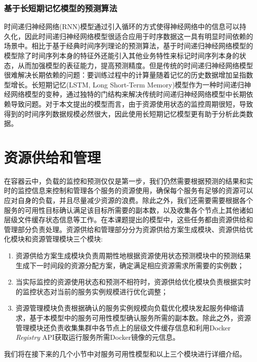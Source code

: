 \subsubsection{基于长短期记忆模型的预测算法}
时间递归神经网络(RNN)模型通过引入循环的方式使得神经网络中的信息可以持久化\cite{graves2012supervised}，因此时间递归神经网络模型很适合应用于时序数据这一具有明显时间依赖的场景中。相比于基于经典时间序列理论的预测算法，基于时间递归神经网络模型的模型除了时间序列本身的特征外还能引入其他业务特性来标记时间序列本身的状态，从而加强模型的表征能力，提高预测精度。但是传统的时间递归神经网络模型很难解决长期依赖的问题：要训练过程中的计算量随着记忆的历史数据增加呈指数型增长\cite{bengio1994learning}。长短期记忆(LSTM, Long Short-Term Memory)模型作为一种时间递归神经网络模型的变种，通过独特的门结构来解决传统时间递归神经网络模型中长期依赖导致问题。对于本文提出的模型而言，由于资源使用状态的监控周期很短，导致得到的时间序列数据规模必然很大，因此使用长短期记忆模型更有助于分析此类数据。

\section{资源供给和管理}
在容器云中，负载的监控和预测仅仅是第一步，我们仍然需要根据预测的结果和实时的监控信息来控制和管理各个服务的资源使用，确保每个服务有足够的资源可以应对自身的负载，并且尽量减少资源的浪费。除此之外，我们还需要需要根据各个服务的可用性目标确认满足该目标所需要的副本数，以及收集各个节点上其他诸如层级文件缓存状态信息等工作。在本课题提出的模型中，这些任务都由资源供给和管理部分负责处理。资源供给和管理部分分为资源供给方案生成模块、资源供给优化模块和资源管理模块三个模块:
\begin{enumerate}
\item 资源供给方案生成模块负责周期性地根据资源使用状态预测模块中的预测结果生成下一时间段的资源分配方案，确定满足相应资源需求所需要的实例数；
\item 当实际监控的资源使用状态和预测不相符时，资源供给优化模块负责根据实时的监控状态对当前的服务实例规模进行优化调整；
\item 资源管理模块负责根据确认的服务实例规模向负载优化模块发起服务伸缩请求，基于本模型中的服务可用性模型确认服务所需的副本数。除此之外，资源管理模块还负责收集集群中各节点上的层级文件缓存信息和利用Docker \emph{Registry} API获取运行服务所需Docker镜像的元信息。
\end{enumerate}
我们将在接下来的几个小节中对服务可用性模型和以上三个模块进行详细介绍。

